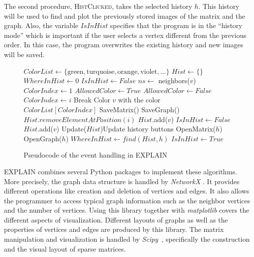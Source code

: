 \documentclass[12pt, oneside]{book}
\begin{document}
The second procedure, \textsc{HistClicked}, takes the selected history $h$. This history will be used to find and plot the previously stored images of the matrix and the graph. Also, the variable $IsInHist$ specifies that the program is in the ``history mode'' which is important if the user selects a vertex different from the previous order. In this case, the program overwrites the existing history and new images will be saved.

\begin{figure}
\centering
\begin{algorithmic}[1]
\State $ColorList \gets \{\text{green}, \text{turquoise},  \text{orange}, \text{violet}, ...\}$
\State $Hist \gets \{\}$
\State $WhereInHist \gets 0$
\State $IsInHist \gets False$
\State
{}
\State $ns\gets$  neighbors($v$)
\State $ColorIndex \gets 1$
\State $AllowedColor \gets True$
\State $AllowedColor \gets False$
\EndIf
\EndFor
{}
\State $ColorIndex \gets i$
\State Break
\EndIf
\EndFor
\State Color $v$ with the color $ColorList[ColorIndex]$
\State
{}
\State SaveMatrix()
\State SaveGraph()
\EndIf
{}
\State $Hist.removeElementAtPosition(i)$
\EndFor
\State $Hist$.add($v$)
\State $IsInHist \gets False$
\Else
\State $Hist$.add($v$)
\EndIf
\State Update($Hist$)\Comment Update history buttons
\EndProcedure
\State
\State
{}
\State OpenMatrix($h$)
\State OpenGraph($h$)
\State $WhereInHist \gets find(Hist,h)$
\State $IsInHist \gets True$
\EndProcedure
\end{algorithmic}
\caption{Pseudocode of the event handling in EXPLAIN}
\label{f:alg}
\end{figure}

\mbox{EXPLAIN} combines several Python packages to implement these algorithms. More precisely, the graph data structure is handled by \textit{NetworkX} \cite{networkx2008}. It provides different operations like creation and deletion of vertices and edges. It also allows the programmer to access typical graph information such as the neighbor vertices and the number of vertices. Using this library together with  \textit{matplotlib} \cite{matplotlib2007} covers the different aspects of visualization. Different layouts of graphs as well as the properties of vertices and edges are produced by this library. The matrix manipulation and visualization is handled by \textit{Scipy}~\cite{scipy2001}, specifically the construction and the visual layout of sparse matrices.
\end{document}
